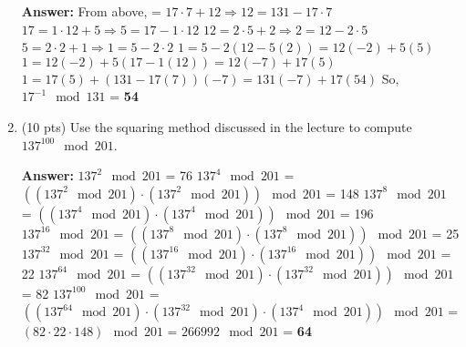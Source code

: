 \documentclass[10pt]{article}
\begin{document}
\begin{enumerate}
	\textbf{Answer:} \newline From above,  = $17\cdot 7 + 12 \Rightarrow 12 = 131 - 17\cdot 7$ \newline $17 = 1\cdot 12 + 5 \Rightarrow 5 = 17 - 1\cdot 12$ \newline $12 = 2\cdot 5 + 2 \Rightarrow 2 = 12 - 2\cdot 5$ \newline $5 = 2\cdot 2 + 1 \Rightarrow 1 = 5 - 2\cdot 2$ \newline \newline $1 = 5 - 2(12 - 5(2)) = 12(-2) + 5(5)$ \newline $1 = 12(-2) + 5(17 - 1(12)) = 12(-7) + 17(5)$ \newline $1 = 17(5) + (131 - 17(7))(-7) = 131(-7) + 17(54)$ \newline So, $17^{-1}\mod 131$ = \textbf{54} \newline
	
	\item (10 pts) Use the squaring method discussed in the lecture to compute $137^{100}\mod 201$.
	
	\textbf{Answer:} \newline $137^{2}\mod 201$ = 76 \newline $137^{4}\mod 201$ = $((137^{2}\mod 201)\cdot (137^{2}\mod 201))\mod 201$ = 148 \newline $137^{8}\mod 201$ = $((137^{4}\mod 201)\cdot (137^{4}\mod 201))\mod 201$ = 196 \newline $137^{16}\mod 201$ = $((137^{8}\mod 201)\cdot (137^{8}\mod 201))\mod 201$ = 25 \newline $137^{32}\mod 201$ = $((137^{16}\mod 201)\cdot (137^{16}\mod 201))\mod 201$ = 22 \newline $137^{64}\mod 201$ = $((137^{32}\mod 201)\cdot (137^{32}\mod 201))\mod 201$ = 82 \newline \newline $137^{100}\mod 201$ = $((137^{64}\mod 201)\cdot (137^{32}\mod 201)\cdot (137^{4}\mod 201))\mod 201$ \newline = $(82\cdot 22\cdot 148)\mod 201$ = $266992\mod 201$ = \textbf{64}
\end{enumerate}
\end{document}
